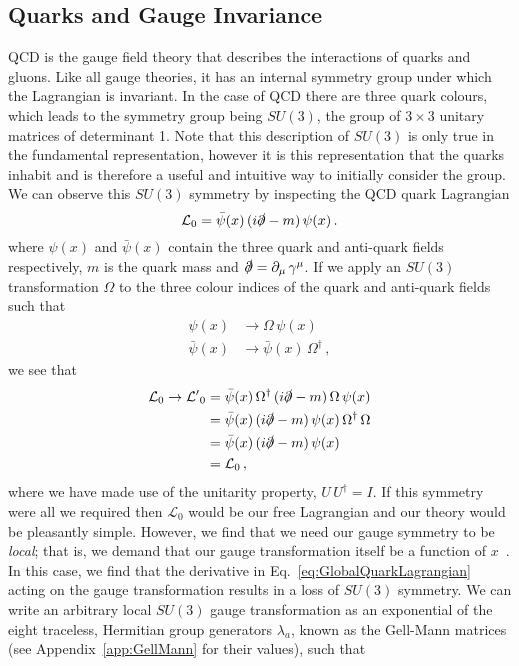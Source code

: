 \subsection{Quarks and Gauge Invariance}
QCD is the gauge field theory that describes the interactions of quarks and gluons. Like all gauge theories, it has an internal symmetry group under which the Lagrangian is invariant. In the case of QCD there are three quark colours, which leads to the symmetry group being $SU(3)$, the group of $3\times 3$ unitary matrices of determinant 1. Note that this description of $SU(3)$ is only true in the fundamental representation, however it is this representation that the quarks inhabit and is therefore a useful and intuitive way to initially consider the group. We can observe this $SU(3)$ symmetry by inspecting the QCD quark Lagrangian
%
\begin{equation}
\mathcal{L}_0 = \bar{\psi}(x)\,(i\slashed{\partial}-m)\,\psi(x)\,.
\label{eq:GlobalQuarkLagrangian}
\end{equation}
%
where $\psi(x)$ and $\bar{\psi}(x)$ contain the three quark and anti-quark fields respectively, $m$ is the quark mass and $\slashed{\partial}=\partial_\mu\,\gamma^\mu$. If we apply an $SU(3)$ transformation $\Omega$ to the three colour indices of the quark and anti-quark fields such that
%
\begin{align*}
\psi(x)&\rightarrow\Omega\,\psi(x)\\
\bar{\psi}(x)&\rightarrow \bar{\psi}(x)\,\Omega^\dagger\, ,
\end{align*}
%
we see that
%
\begin{align*}
\mathcal{L}_0\rightarrow\mathcal{L'}_0&=\bar{\psi}(x)\,\Omega^\dag\,(i\slashed{\partial}-m)\,\Omega\,\psi(x)\\
&= \bar{\psi}(x)\,(i\slashed{\partial}-m)\,\psi(x)\,\Omega^\dag\,\Omega\\
&= \bar{\psi}(x)\,(i\slashed{\partial}-m)\,\psi(x)\\
&= \mathcal{L}_0\, ,
\end{align*}
%
where we have made use of the unitarity property, $U\,U^\dag = I$. If this symmetry were all we required then $\mathcal{L}_0$ would be our free Lagrangian and our theory would be pleasantly simple. However, we find that we need our gauge symmetry to be \textit{local}; that is, we demand that our gauge transformation itself be a function of $x$~\cite{peskin2018introduction}. In this case, we find that the derivative in Eq.~\ref{eq:GlobalQuarkLagrangian} acting on the gauge transformation results in a loss of $SU(3)$ symmetry. We can write an arbitrary local $SU(3)$ gauge transformation as an exponential of the eight traceless, Hermitian group generators $\lambda_a$, known as the Gell-Mann matrices (see Appendix~\ref{app:GellMann} for their values), such that 
